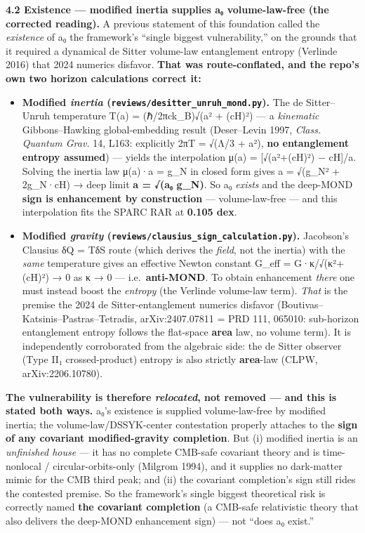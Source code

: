 \documentclass[
]{article}
\providecommand{\tightlist}{%
  \setlength{\itemsep}{0pt}\setlength{\parskip}{0pt}}
\begin{document}
\textbf{4.2 Existence --- modified inertia supplies a₀ volume-law-free
(the corrected reading).} A previous statement of this foundation called
the \emph{existence} of a₀ the framework's ``single biggest
vulnerability,'' on the grounds that it required a dynamical de Sitter
volume-law entanglement entropy (Verlinde 2016) that 2024 numerics
disfavor. \textbf{That was route-conflated, and the repo's own two
horizon calculations correct it:}

\begin{itemize}
\tightlist
\item
  \textbf{Modified \emph{inertia}
  (\texttt{reviews/desitter\_unruh\_mond.py}).} The de Sitter--Unruh
  temperature T(a) = (ℏ/2πck\_B)√(a² + (cH)²) --- a \emph{kinematic}
  Gibbons--Hawking global-embedding result (Deser--Levin 1997,
  \emph{Class. Quantum Grav.} 14, L163: explicitly 2πT = √(Λ/3 + a²),
  \textbf{no entanglement entropy assumed}) --- yields the interpolation
  μ(a) = {[}√(a²+(cH)²) − cH{]}/a. Solving the inertia law μ(a)·a = g\_N
  in closed form gives a = √(g\_N² + 2g\_N·cH) → deep limit \textbf{a =
  √(a₀ g\_N)}. So a₀ \emph{exists} and the deep-MOND \textbf{sign is
  enhancement by construction} --- volume-law-free --- and this
  interpolation fits the SPARC RAR at \textbf{0.105 dex}.
\item
  \textbf{Modified \emph{gravity}
  (\texttt{reviews/clausius\_sign\_calculation.py}).} Jacobson's
  Clausius δQ = TδS route (which derives the \emph{field}, not the
  inertia) with the \emph{same} temperature gives an effective Newton
  constant G\_eff = G·κ/√(κ²+(cH)²) → 0 as κ → 0 ---
  i.e.~\textbf{anti-MOND}. To obtain enhancement \emph{there} one must
  instead boost the \emph{entropy} (the Verlinde volume-law term).
  \emph{That} is the premise the 2024 de Sitter-entanglement numerics
  disfavor (Boutivas--Katsinis--Pastras--Tetradis, arXiv:2407.07811 =
  PRD 111, 065010: sub-horizon entanglement entropy follows the
  flat-space \textbf{area} law, no volume term). It is independently
  corroborated from the algebraic side: the de Sitter observer (Type II₁
  crossed-product) entropy is also strictly \textbf{area}-law (CLPW,
  arXiv:2206.10780).
\end{itemize}

\textbf{The vulnerability is therefore \emph{relocated}, not removed ---
and this is stated both ways.} a₀'s existence is supplied
volume-law-free by modified inertia; the volume-law/DSSYK-center
contestation properly attaches to the \textbf{sign of any covariant
modified-gravity completion}. But (i) modified inertia is an
\emph{unfinished house} --- it has no complete CMB-safe covariant theory
and is time-nonlocal / circular-orbits-only (Milgrom 1994), and it
supplies no dark-matter mimic for the CMB third peak; and (ii) the
covariant completion's sign still rides the contested premise. So the
framework's single biggest theoretical risk is correctly named
\textbf{the covariant completion} (a CMB-safe relativistic theory that
also delivers the deep-MOND enhancement sign) --- not ``does a₀ exist.''
\end{document}
